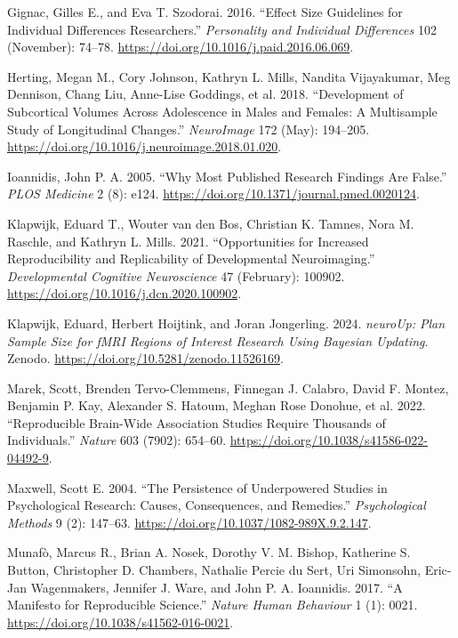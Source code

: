 \documentclass[
  letterpaper,
  DIV=11,
  numbers=noendperiod]{scrartcl}
\newlength{\cslhangindent}
\newenvironment{CSLReferences}[2] %
 {\begin{list}{}{%
  \setlength{\itemindent}{0pt}
  \setlength{\leftmargin}{0pt}
  \setlength{\parsep}{0pt}
  \ifodd #1
   \setlength{\leftmargin}{\cslhangindent}
   \setlength{\itemindent}{-1\cslhangindent}
  \fi
  \setlength{\itemsep}{#2\baselineskip}}}
 {\end{list}}
\begin{document}
\begin{CSLReferences}{1}{0}
Gignac, Gilles E., and Eva T. Szodorai. 2016. {``Effect Size Guidelines
for Individual Differences Researchers.''} \emph{Personality and
Individual Differences} 102 (November): 74--78.
\url{https://doi.org/10.1016/j.paid.2016.06.069}.

Herting, Megan M., Cory Johnson, Kathryn L. Mills, Nandita Vijayakumar,
Meg Dennison, Chang Liu, Anne-Lise Goddings, et al. 2018. {``Development
of Subcortical Volumes Across Adolescence in Males and Females: A
Multisample Study of Longitudinal Changes.''} \emph{NeuroImage} 172
(May): 194--205. \url{https://doi.org/10.1016/j.neuroimage.2018.01.020}.

Ioannidis, John P. A. 2005. {``Why Most Published Research Findings Are
False.''} \emph{PLOS Medicine} 2 (8): e124.
\url{https://doi.org/10.1371/journal.pmed.0020124}.

Klapwijk, Eduard T., Wouter van den Bos, Christian K. Tamnes, Nora M.
Raschle, and Kathryn L. Mills. 2021. {``Opportunities for Increased
Reproducibility and Replicability of Developmental Neuroimaging.''}
\emph{Developmental Cognitive Neuroscience} 47 (February): 100902.
\url{https://doi.org/10.1016/j.dcn.2020.100902}.

Klapwijk, Eduard, Herbert Hoijtink, and Joran Jongerling. 2024.
\emph{neuroUp: Plan Sample Size for fMRI Regions of Interest Research
Using Bayesian Updating}. Zenodo.
\url{https://doi.org/10.5281/zenodo.11526169}.

Marek, Scott, Brenden Tervo-Clemmens, Finnegan J. Calabro, David F.
Montez, Benjamin P. Kay, Alexander S. Hatoum, Meghan Rose Donohue, et
al. 2022. {``Reproducible Brain-Wide Association Studies Require
Thousands of Individuals.''} \emph{Nature} 603 (7902): 654--60.
\url{https://doi.org/10.1038/s41586-022-04492-9}.

Maxwell, Scott E. 2004. {``The Persistence of Underpowered Studies in
Psychological Research: Causes, Consequences, and Remedies.''}
\emph{Psychological Methods} 9 (2): 147--63.
\url{https://doi.org/10.1037/1082-989X.9.2.147}.

Munafò, Marcus R., Brian A. Nosek, Dorothy V. M. Bishop, Katherine S.
Button, Christopher D. Chambers, Nathalie Percie du Sert, Uri Simonsohn,
Eric-Jan Wagenmakers, Jennifer J. Ware, and John P. A. Ioannidis. 2017.
{``A Manifesto for Reproducible Science.''} \emph{Nature Human
Behaviour} 1 (1): 0021. \url{https://doi.org/10.1038/s41562-016-0021}.


\end{CSLReferences}
\end{document}
